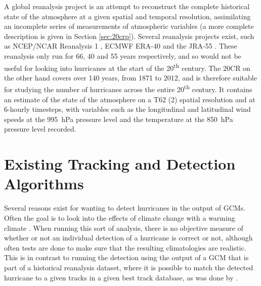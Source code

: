 \documentclass[pdftex,12pt,a4paper]{report}
\newcommand{\ts}{\textsuperscript}
\begin{document}

A global reanalysis project is an attempt to reconstruct the complete historical state of the
atmosphere at a given spatial and temporal resolution, assimilating an incomplete series of
measurements of atmospheric variables (a more complete description is given in Section
\ref{sec:20crp}). %
Several reanalysis projects exist, such as NCEP/NCAR Reanalysis 1
\parencite{TODOCITE}, ECMWF ERA-40 \parencite{uppalaEra2006} and the JRA-55 \parencite{TODOCITE}.
These reanalysis only run for 66, 40 and 55 years respectively, and so would not be useful for
looking into hurricanes at the start of the 20\ts{th} century. The 20CR on the other hand covers
over 140 years, from 1871 to 2012, and is therefore suitable for studying the number of hurricanes
across the entire 20\ts{th} century.  It contains an estimate of the state of the atmosphere on a
T62 (2\textdegree) spatial resolution and at 6-hourly timesteps, with variables such as the
longitudinal and latitudinal wind speeds at the \SI{995}{hPa} pressure level and the temperature at
the \SI{850}{hPa} pressure level recorded.

\section{Existing Tracking and Detection Algorithms}


Several reasons exist for wanting to detect hurricanes in the output of GCMs. Often the goal is to
look into the effects of climate change with a warming climate \parencite{bengtsson1996, sugi2002,
yoshimura2006}. When running this sort of analysis, there is no objective measure of whether or not
an individual detection of a hurricane is correct or not, although often tests are done to make sure
that the resulting climatologies are realistic. This is in contrast to running the detection using
the output of a GCM that is part of a historical reanalysis dataset, where it is possible to match
the detected hurricane to a given tracks in a given best track database, as was done by
\textcite{walsh1995}.
\end{document}
